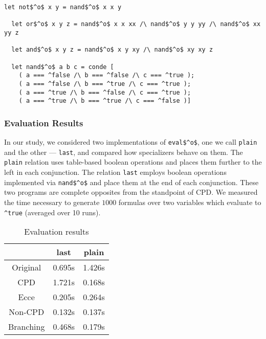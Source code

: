 \begin{figure*}[!h]
  \centering
  \begin{minipage}{0.85\textwidth}
    \begin{lstlisting}[label={not:nando}, caption={Implementation of boolean operation via \lstinline{nand}}, captionpos=b, frame=tb]
  let not$^o$ x y = nand$^o$ x x y

  let or$^o$ x y z = nand$^o$ x x xx /\ nand$^o$ y y yy /\ nand$^o$ xx yy z

  let and$^o$ x y z = nand$^o$ x y xy /\ nand$^o$ xy xy z

  let nand$^o$ a b c = conde [
    ( a === ^false /\ b === ^false /\ c === ^true );
    ( a === ^false /\ b === ^true /\ c === ^true );
    ( a === ^true /\ b === ^false /\ c === ^true );
    ( a === ^true /\ b === ^true /\ c === ^false )]
    \end{lstlisting}
  \end{minipage}
\end{figure*}

\subsubsection{Evaluation Results}
In our study, we considered two implementations of \lstinline{eval$^o$}, one we call \lstinline{plain} and the other --- \lstinline{last}, and compared how specializers behave on them.
The \lstinline{plain} relation uses table-based boolean operations and places them further to the left in each conjunction.
The relation \lstinline{last} employs boolean operations implemented via \lstinline{nand$^o$} and place them at the end of each conjunction.
These two programs are complete opposites from the standpoint of CPD.
We measured the time necessary to generate $1000$ formulas over two variables which evaluate to \lstinline{^true} (averaged over 10 runs).


\begin{table}
  \centering
  \begin{tabular}{c||c||c}
                   & last    & plain  \\
  \hline\hline
  Original         & 0.695s  & 1.426s \\
  \hline
  CPD              & 1.721s  & 0.168s \\
  \hline
  Ecce             & 0.205s  & 0.264s \\
  \hline
  Non-CPD          & 0.132s  & 0.137s \\
  \hline
  Branching        & 0.468s  & 0.179s \\
  \end{tabular}

  \caption{Evaluation results}
  \label{tbl:eval}
\end{table}


